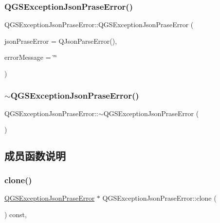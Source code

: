\subsubsection{\texorpdfstring{Q\+G\+S\+Exception\+Json\+Prase\+Error()}{QGSExceptionJsonPraseError()}}
{\footnotesize\ttfamily Q\+G\+S\+Exception\+Json\+Prase\+Error\+::\+Q\+G\+S\+Exception\+Json\+Prase\+Error (\begin{DoxyParamCaption}\item[{const Q\+Json\+Parse\+Error \&}]{json\+Prase\+Error = {\ttfamily QJsonParseError()},  }\item[{const Q\+String \&}]{error\+Message = {\ttfamily \char`\"{}\char`\"{}} }\end{DoxyParamCaption})}

\mbox{\label{class_q_g_s_exception_json_prase_error_ae77b38c95ba55b690e3f78b7d6709406}} 
\subsubsection{\texorpdfstring{$\sim$\+Q\+G\+S\+Exception\+Json\+Prase\+Error()}{~QGSExceptionJsonPraseError()}}
{\footnotesize\ttfamily Q\+G\+S\+Exception\+Json\+Prase\+Error\+::$\sim$\+Q\+G\+S\+Exception\+Json\+Prase\+Error (\begin{DoxyParamCaption}{ }\end{DoxyParamCaption})\hspace{0.3cm}{\ttfamily [virtual]}}



\subsection{成员函数说明}
\mbox{\label{class_q_g_s_exception_json_prase_error_a299d1b5dff92fda50864d5b6de676678}} 
\subsubsection{\texorpdfstring{clone()}{clone()}}
{\footnotesize\ttfamily \mbox{\hyperlink{class_q_g_s_exception_json_prase_error}{Q\+G\+S\+Exception\+Json\+Prase\+Error}} $\ast$ Q\+G\+S\+Exception\+Json\+Prase\+Error\+::clone (\begin{DoxyParamCaption}{ }\end{DoxyParamCaption}) const\hspace{0.3cm}{\ttfamily [override]}, {\ttfamily [virtual]}}



